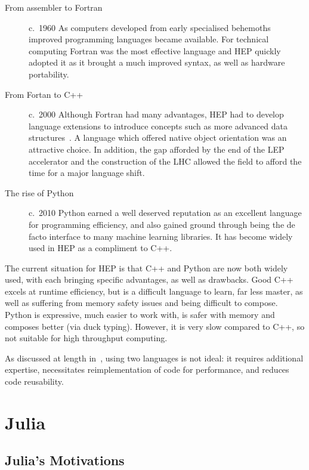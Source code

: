 \documentclass{webofc}
\begin{document}
\begin{description}
    \item[From assembler to Fortran] c.~1960 As computers developed from early
    specialised behemoths improved programming
    languages became available. For technical computing Fortran was the most
    effective language and HEP quickly adopted it as it brought a much improved
    syntax, as well as hardware portability.
    \item[From Fortan to C++] c.~2000 Although Fortran had many advantages, HEP had to
    develop language extensions to introduce concepts such as more advanced data
    structures~\cite{Zoll:2296399}. A language which offered native object
    orientation was an attractive choice. In addition, the gap afforded by the
    end of the LEP accelerator and the construction of the LHC allowed the field
    to afford the time for a major language shift.
    \item[The rise of Python] c.~2010 Python earned a well deserved reputation as an
    excellent language for programming efficiency, and also gained ground
    through being the de facto interface to many machine learning libraries. It
    has become widely used in HEP as a compliment to C++.
\end{description}

The current situation for HEP is that C++ and Python are now both widely used,
with each bringing specific advantages, as well as drawbacks. Good C++ excels at
runtime efficiency, but is a difficult language to learn, far less master, as well as
suffering from memory safety issues and being difficult to compose. Python is
expressive, much easier to work with, is safer with memory and composes better
(via duck typing). However, it is very slow compared to C++, so not suitable for
high throughput computing.

As discussed at length in~\cite{eschle2023potential}, using two languages is not ideal: it
requires additional expertise, necessitates reimplementation of code for
performance, and reduces code reusability.

\section{Julia}

\subsection{Julia's Motivations}
\end{document}
